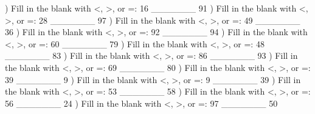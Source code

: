 \documentclass{article}%
\begin{document}
) Fill in the blank with <, >, or =: 16 \_\_\_\_\_\_\_ 91%
\newline%
\newline%
) Fill in the blank with <, >, or =: 28 \_\_\_\_\_\_\_ 97%
\newline%
\newline%
) Fill in the blank with <, >, or =: 49 \_\_\_\_\_\_\_ 36%
\newline%
\newline%
) Fill in the blank with <, >, or =: 92 \_\_\_\_\_\_\_ 94%
\newline%
\newline%
) Fill in the blank with <, >, or =: 60 \_\_\_\_\_\_\_ 79%
\newline%
\newline%
) Fill in the blank with <, >, or =: 48 \_\_\_\_\_\_\_ 83%
\newline%
\newline%
) Fill in the blank with <, >, or =: 86 \_\_\_\_\_\_\_ 93%
\newline%
\newline%
) Fill in the blank with <, >, or =: 69 \_\_\_\_\_\_\_ 80%
\newline%
\newline%
) Fill in the blank with <, >, or =: 39 \_\_\_\_\_\_\_ 9%
\newline%
\newline%
) Fill in the blank with <, >, or =: 9 \_\_\_\_\_\_\_ 39%
\newline%
\newline%
) Fill in the blank with <, >, or =: 53 \_\_\_\_\_\_\_ 58%
\newline%
\newline%
) Fill in the blank with <, >, or =: 56 \_\_\_\_\_\_\_ 24%
\newline%
\newline%
) Fill in the blank with <, >, or =: 97 \_\_\_\_\_\_\_ 50%
\end{document}
